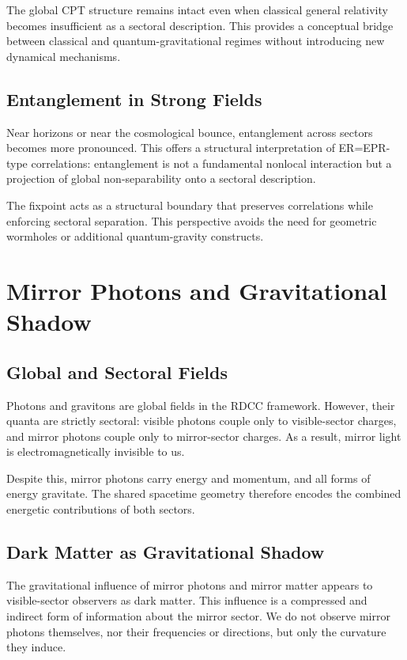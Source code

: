 \documentclass[11pt,a4paper]{article}
\begin{document}
The global CPT structure remains intact even when classical general relativity becomes insufficient as a sectoral description. This provides a conceptual bridge between classical and quantum-gravitational regimes without introducing new dynamical mechanisms.

\subsection{Entanglement in Strong Fields}

Near horizons or near the cosmological bounce, entanglement across sectors becomes more pronounced. This offers a structural interpretation of ER=EPR-type correlations: entanglement is not a fundamental nonlocal interaction but a projection of global non-separability onto a sectoral description.

The fixpoint acts as a structural boundary that preserves correlations while enforcing sectoral separation. This perspective avoids the need for geometric wormholes or additional quantum-gravity constructs.

\section{Mirror Photons and Gravitational Shadow}

\subsection{Global and Sectoral Fields}

Photons and gravitons are global fields in the RDCC framework. However, their quanta are strictly sectoral: visible photons couple only to visible-sector charges, and mirror photons couple only to mirror-sector charges. As a result, mirror light is electromagnetically invisible to us.

Despite this, mirror photons carry energy and momentum, and all forms of energy gravitate. The shared spacetime geometry therefore encodes the combined energetic contributions of both sectors.

\subsection{Dark Matter as Gravitational Shadow}

The gravitational influence of mirror photons and mirror matter appears to visible-sector observers as dark matter. This influence is a compressed and indirect form of information about the mirror sector. We do not observe mirror photons themselves, nor their frequencies or directions, but only the curvature they induce.
\end{document}
